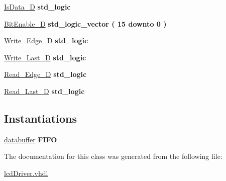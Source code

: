 \begin{DoxyCompactItemize}
\item 
\mbox{\label{classLcdDriver_1_1LCD_a520390c4bac9e8d56530e87a3757221d}} 
\hyperlink{classLcdDriver_1_1LCD_a520390c4bac9e8d56530e87a3757221d}{Is\+Data\+\_\+D} {\bfseries \textcolor{vhdlchar}{std\+\_\+logic}\textcolor{vhdlchar}{ }} 
\item 
\mbox{\label{classLcdDriver_1_1LCD_a1fdded4d7a1bd30bf7bb065751b5d3bd}} 
\hyperlink{classLcdDriver_1_1LCD_a1fdded4d7a1bd30bf7bb065751b5d3bd}{Bit\+Enable\+\_\+D} {\bfseries \textcolor{vhdlchar}{std\+\_\+logic\+\_\+vector}\textcolor{vhdlchar}{ }\textcolor{vhdlchar}{(}\textcolor{vhdlchar}{ }\textcolor{vhdlchar}{ } \textcolor{vhdldigit}{15} \textcolor{vhdlchar}{ }\textcolor{vhdlchar}{downto}\textcolor{vhdlchar}{ }\textcolor{vhdlchar}{ } \textcolor{vhdldigit}{0} \textcolor{vhdlchar}{ }\textcolor{vhdlchar}{)}\textcolor{vhdlchar}{ }} 
\item 
\mbox{\label{classLcdDriver_1_1LCD_a13084956378e5d1870a120551cdcc15e}} 
\hyperlink{classLcdDriver_1_1LCD_a13084956378e5d1870a120551cdcc15e}{Write\+\_\+\+Edge\+\_\+D} {\bfseries \textcolor{vhdlchar}{std\+\_\+logic}\textcolor{vhdlchar}{ }} 
\item 
\mbox{\label{classLcdDriver_1_1LCD_aa636d0a07fe3d651bc4ff7bfd3cbcd1b}} 
\hyperlink{classLcdDriver_1_1LCD_aa636d0a07fe3d651bc4ff7bfd3cbcd1b}{Write\+\_\+\+Last\+\_\+D} {\bfseries \textcolor{vhdlchar}{std\+\_\+logic}\textcolor{vhdlchar}{ }} 
\item 
\mbox{\label{classLcdDriver_1_1LCD_a5f2bd27dbd5322df7874cc38de794d6e}} 
\hyperlink{classLcdDriver_1_1LCD_a5f2bd27dbd5322df7874cc38de794d6e}{Read\+\_\+\+Edge\+\_\+D} {\bfseries \textcolor{vhdlchar}{std\+\_\+logic}\textcolor{vhdlchar}{ }} 
\item 
\mbox{\label{classLcdDriver_1_1LCD_a3c0fa31aacd37b70ca2fd7b289cecbb9}} 
\hyperlink{classLcdDriver_1_1LCD_a3c0fa31aacd37b70ca2fd7b289cecbb9}{Read\+\_\+\+Last\+\_\+D} {\bfseries \textcolor{vhdlchar}{std\+\_\+logic}\textcolor{vhdlchar}{ }} 
\end{DoxyCompactItemize}
\subsection*{Instantiations}
 \begin{DoxyCompactItemize}
\item 
\mbox{\label{classLcdDriver_1_1LCD_a29d3add4a26a57750813a567c58e23b1}} 
\hyperlink{classLcdDriver_1_1LCD_a29d3add4a26a57750813a567c58e23b1}{databuffer}  {\bfseries F\+I\+FO}   
\end{DoxyCompactItemize}


The documentation for this class was generated from the following file\+:\begin{DoxyCompactItemize}
\item 
\hyperlink{lcdDriver_8vhdl}{lcd\+Driver.\+vhdl}\end{DoxyCompactItemize}

